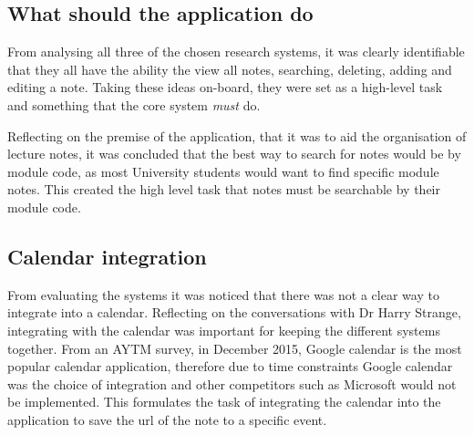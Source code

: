 \subsection{What should the application do}
From analysing all three of the chosen research systems, it was clearly identifiable that they all have the ability the view all notes, searching, deleting, adding and editing a note. Taking these ideas on-board, they were set as a high-level task and something that the core system \textit{must} do.

Reflecting on the premise of the application, that it was to aid the organisation of lecture notes, it was concluded that the best way to search for notes would be by module code, as most University students would want to find specific module notes. This created the high level task that notes must be searchable by their module code.

\subsection{Calendar integration}
From evaluating the systems it was noticed that there was not a clear way to integrate into a calendar. Reflecting on the conversations with Dr Harry Strange, integrating with the calendar was important for keeping the different systems together. From an AYTM survey, in December 2015, \cite{citeulike:14010520} Google calendar is the most popular calendar application, therefore due to time constraints Google calendar was the choice of integration and other competitors such as Microsoft would not be implemented. This formulates the task of integrating the calendar into the application to save the url of the note to a specific event.

